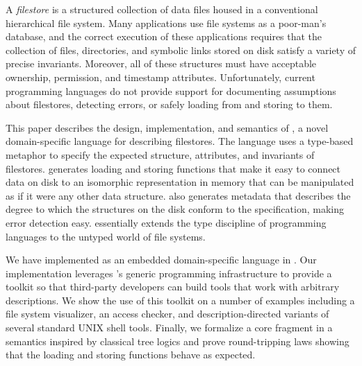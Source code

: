 A {\em filestore} is a structured collection of data files housed in a
conventional hierarchical file system. Many applications use file
systems as a poor-man's database, and the correct execution of these
applications requires that the collection of files, directories, and
symbolic links stored on disk satisfy a variety of precise
invariants. Moreover, all of these structures must have acceptable
ownership, permission, and timestamp attributes. Unfortunately,
current programming languages do not provide support for documenting
assumptions about filestores, detecting errors, or safely loading from
and storing to them.

This paper describes the design, implementation, and semantics of
\forest{}, a novel domain-specific language for describing
filestores. The language uses a type-based metaphor to specify the
expected structure, attributes, and invariants of filestores.
\forest{} generates loading and storing functions that make it easy to
connect data on disk to an isomorphic representation in memory that
can be manipulated as if it were any other data structure.  \forest{}
also generates metadata that describes the degree to which the
structures on the disk conform to the specification, making error
detection easy. \forest{} essentially extends the type discipline of
programming languages to the untyped world of file systems.

We have implemented \forest{} as an embedded domain-specific language
in \haskell{}. Our implementation leverages \haskell{}'s 
generic programming infrastructure to provide a toolkit so that
third-party developers can build tools that work with
arbitrary \forest{} descriptions.  We show the use of this toolkit on
a number of examples including a file system visualizer, an access
checker, and description-directed variants of several standard UNIX
shell tools. Finally, we formalize a core fragment \forest{} in a
semantics inspired by classical tree logics and prove round-tripping
laws showing that the loading and storing functions behave as
expected.
